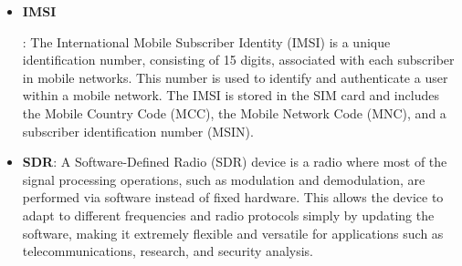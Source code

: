 \documentclass[english]{article}
\begin{document}
\begin{itemize}
	\item \hypertarget{IMSI}{\textbf{IMSI}}:
	      The International Mobile Subscriber Identity (IMSI) is a unique identification number,
	      consisting of 15 digits, associated with each subscriber in mobile networks.
	      This number is used to identify and authenticate a user within a mobile network.
	      The IMSI is stored in the SIM card and includes the Mobile Country Code (MCC),
	      the Mobile Network Code (MNC), and a subscriber identification number (MSIN).

	\item \textbf{\hypertarget{SDR}{SDR}}:
	      A Software-Defined Radio (SDR) device is a radio where most of the signal processing operations,
	      such as modulation and demodulation, are performed via software instead of fixed hardware.
	      This allows the device to adapt to different frequencies and radio protocols simply by
	      updating the software, making it extremely flexible and versatile for applications such
	      as telecommunications, research, and security analysis.


\end{itemize}
\end{document}
